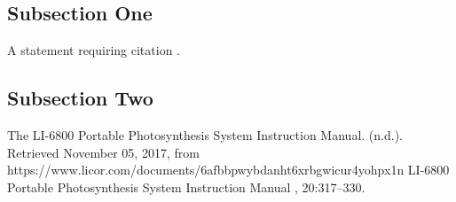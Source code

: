 \documentclass[twoside,twocolumn]{article}
\begin{document}
\subsection{Subsection One}


A statement requiring citation \cite{Figueredo:2009dg}.
\blindtext %

\subsection{Subsection Two}

\blindtext %


\begin{thebibliography}{99} %

\bibitemUsing The LI-6800 Portable Photosynthesis System Instruction Manual. (n.d.). Retrieved November 05, 2017, from https://www.licor.com/documents/6afbbpwybdanht6xrbgwicur4yohpx1n
\newblock LI-6800 Portable Photosynthesis System Instruction Manual
, 20:317--330.
 
\end{thebibliography}

\end{document}

